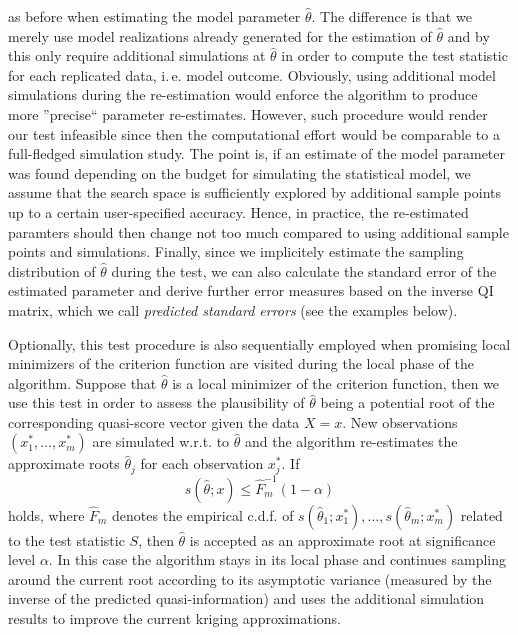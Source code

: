\documentclass[article, nojss]{jss}
\numberwithin{equation}{section}			%
\begin{document}
as before when estimating the model parameter $\hat{\theta}$. The difference is
that we merely use model realizations already generated for the estimation of $\hat{\theta}$ and
by this only require additional simulations at $\hat{\theta}$ in order to
compute the test statistic for each replicated data, i.\,e. model outcome.
Obviously, using additional model simulations during the re-estimation would enforce the
algorithm to produce more ''precise`` parameter re-estimates. However, such
procedure would render our test infeasible since then the computational effort
would be comparable to a full-fledged simulation study. The point is, if an estimate of
the model parameter was found depending on the budget for simulating the statistical model,
we assume that the search space is sufficiently explored by additional sample
points up to a certain user-specified accuracy. Hence, in practice, the re-estimated paramters
should then change not too much compared to using additional sample points and
simulations. Finally, since we implicitely estimate the sampling distribution of $\hat{\theta}$
during the test, we can also calculate the standard error of the estimated
parameter and derive further error measures based on the inverse QI matrix,
which we call \emph{predicted standard errors} (see the  examples
below).\par
%
Optionally, this test procedure is also sequentially employed when promising local minimizers of
the criterion function are visited during the local phase of the algorithm.
Suppose that $\hat{\theta}$ is a local minimizer of the criterion function, then we use this test
in order to assess the plausibility of $\hat{\theta}$
being a potential root of the corresponding quasi-score vector given the data $X=x$.
New observations $(x^*_1,\ldots,x^*_m)$ are simulated w.r.t.
to $\hat{\theta}$ and the algorithm re-estimates the approximate roots
$\hat{\theta}_j$ for each observation $x^*_j$. If 
\begin{equation}\label{empQuantile}
  s(\hat{\theta};x) \leq \hat{F}^{-1}_{m}(1-\alpha)     
\end{equation}
holds, where $\hat{F}_m$ denotes the empirical c.d.f. of $s(\hat{\theta}_1;x^*_1),\ldots,s(\hat{\theta}_m;x^*_m)$ related
to the test statistic $S$, then $\hat{\theta}$ is accepted as an approximate
root at significance level $\alpha$. In this case the algorithm stays in its local phase and continues sampling around the
current root according to its asymptotic variance (measured by the inverse of
the predicted quasi-information) and uses the additional simulation results to improve the current kriging approximations.
\end{document}
